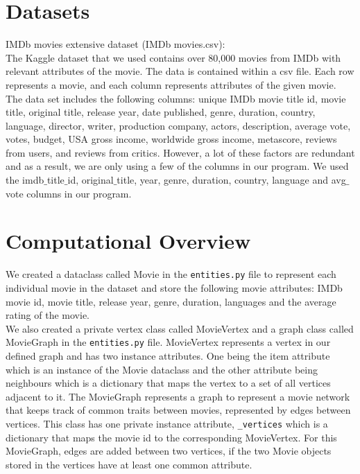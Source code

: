 \documentclass[fontsize=11pt]{article}
\begin{document}
\section*{Datasets}
IMDb movies extensive dataset (IMDb movies.csv):\\
The Kaggle dataset that we used contains over 80,000 movies from IMDb with relevant attributes of the movie. The data is contained within a csv file. Each row represents a movie, and each column represents attributes of the given movie. The data set includes the following columns: unique IMDb movie title id, movie title, original title, release year, date published, genre, duration, country, language, director, writer, production company, actors, description, average vote, votes, budget, USA gross income, worldwide gross income, metascore, reviews from users, and reviews from critics. However, a lot of these factors are redundant and as a result, we are only using a few of the columns in our program. We used the imdb$\_$title$\_$id, original$\_$title, year, genre, duration, country, language and avg$\_$vote columns in our program.

\section*{Computational Overview}
We created a dataclass called Movie in the \texttt{entities.py} file to represent each individual movie in the dataset and store the following movie attributes: IMDb movie id, movie title, release year, genre, duration, languages and the average rating of the movie. \\

We also created a private vertex class called MovieVertex and a graph class called MovieGraph in the \texttt{entities.py} file. MovieVertex represents a vertex in our defined graph and has two instance attributes. One being the item attribute which is an instance of the Movie dataclass and the other attribute being neighbours which is a dictionary that maps the vertex to a set of all vertices adjacent to it. The MovieGraph represents a graph to represent a movie network that keeps track of common traits between movies, represented by edges between vertices. This class has one private instance attribute, \texttt{\_vertices} which is a dictionary that maps the movie id to the corresponding MovieVertex. For this MovieGraph, edges are added between two vertices, if the two Movie objects stored in the vertices have at least one common attribute.\\
\end{document}
